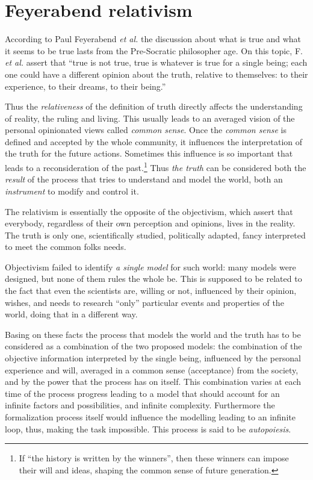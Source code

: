 \section{Feyerabend relativism}

According to Paul Feyerabend \textit{\textit{et al.}}\cite{PF} the discussion about what is true
and what it seems to be true lasts from the Pre-Socratic philosopher age.
On this topic, F. \textit{\textit{et al.}} assert that ``true is not true, true is whatever is true for
a single being; each one could have a different opinion about the truth, relative
to themselves: to their experience, to their dreams, to their being.''

Thus the \textit{relativeness} of the definition of truth directly affects the
understanding of reality, the ruling and living. This usually  leads to
an averaged vision of the personal opinionated views called \textit{common sense}.
Once the \textit{common sense} is defined and accepted by the whole community,
it influences the interpretation of the truth for the future actions.
Sometimes this influence is so important that leads to a reconsideration of the
past.\footnote{If ``the history is written by the winners'', then these winners can impose their will and ideas, shaping the common sense of future generation.}
Thus \textit{the truth} can be considered both the \textit{result} of the
process that tries to understand and model the world, both an
\textit{instrument} to modify and control it.

The relativism is essentially the opposite of the objectivism, which assert that
everybody, regardless of their own perception and opinions, lives in the reality.
The truth is only one, scientifically studied, politically adapted, fancy
interpreted to meet the common folks needs\cite{PF}.

Objectivism failed to identify \textit{a single model} for such world: many models were designed, but none of them rules the whole be.
This is supposed to be related to the fact that even the scientists are, willing
or not, influenced by their opinion, wishes, and needs to research ``only'' particular events and properties of the world, doing that in a different way.

Basing on these facts the process that models the world and the truth has to be considered as
a combination of the two proposed models: the combination of the objective
information interpreted by the single being, influenced by the personal
experience and will, averaged in a common sense (acceptance) from the society,
and by the power that the process has on itself.
This combination varies at each time of the process progress leading to
a model that should account for an infinite factors and possibilities,
and infinite complexity. Furthermore  the formalization process itself would influence
the modelling leading to an infinite loop, thus, making the task impossible.
This process is said to be \textit{autopoiesis}.

